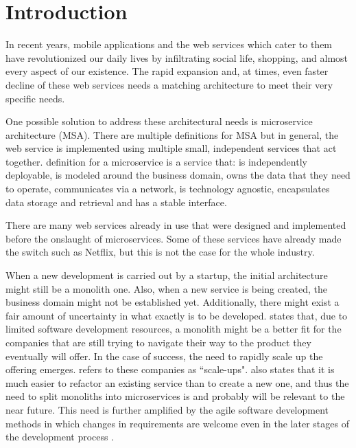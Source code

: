 


\section{Introduction}
\begin{sloppypar}
    In recent years, mobile applications and the web services which cater to
    them have revolutionized our daily lives by infiltrating social life,
    shopping, and almost every aspect of our existence. The rapid expansion and,
    at times, even faster decline of these web services needs a matching
    architecture to meet their very specific needs.
\end{sloppypar}
\begin{sloppypar} 
    One possible solution to address these architectural needs is microservice
    architecture (MSA). There are multiple definitions for MSA but in general,
    the web service is implemented using multiple small, independent services
    that act together. \citet{newman2019} definition for a microservice is a
    service that: is independently deployable, is modeled around the business
    domain, owns the data that they need to operate, communicates via a
    network, is technology agnostic, encapsulates data storage and retrieval
    and has a stable interface.
\end{sloppypar}
\begin{sloppypar}
    There are many web services already in use that were designed and
    implemented before the onslaught of microservices. Some of these services
    have already made the switch such as Netflix, but this is not the case for
    the whole industry.
\end{sloppypar}
\begin{sloppypar}
    When a new development is carried out by a startup, the initial architecture
    might still be a monolith one. Also, when a new service is being created,
    the business domain might not be established yet. Additionally, there might
    exist a fair amount of uncertainty in what exactly is to be developed.
    \citet{newman2019} states that, due to limited software development
    resources, a monolith might be a better fit for the companies that are still
    trying to navigate their way to the product they eventually will offer. In
    the case of success, the need to rapidly scale up the offering emerges.
    \citet{newman2019} refers to these companies as ``scale-ups".
    \citet{newman2019} also states that it is much easier to refactor an
    existing service than to create a new one, and thus the need to split
    monoliths into microservices is and probably will be relevant to the near
    future. This need is further amplified by the agile software development
    methods in which changes in requirements are welcome even in the later
    stages of the development process \citep{agilemanifesto}.
\end{sloppypar}
